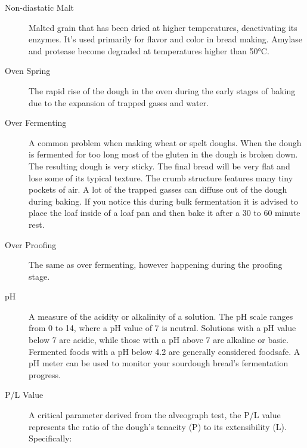 \begin{description}
\item[Non-diastatic Malt] Malted grain that has been dried at higher temperatures,
deactivating its enzymes. It's used primarily for flavor and color in bread making.
Amylase and protease become degraded at temperatures higher than 50°C.

\item[Oven Spring] The rapid rise of the dough in the oven during the early stages
of baking due to the expansion of trapped gases and water.

\item[Over Fermenting] A common problem when making wheat or spelt doughs. When the
dough is fermented for too long most of the gluten in the dough is broken down. The
resulting dough is very sticky. The final bread will be very flat and lose some of its
typical texture. The crumb structure features many tiny pockets of air. A lot of the
trapped gasses can diffuse out of the dough during baking. If you notice this during
bulk fermentation it is advised to place the loaf inside of a loaf pan and then bake
it after a 30 to 60 minute rest.

\item[Over Proofing] The same as over fermenting, however happening during the
proofing stage.

\item[pH] A measure of the acidity or alkalinity of a solution. The pH scale
ranges from 0 to 14, where a pH value of 7 is neutral. Solutions with a pH value below
7 are acidic, while those with a pH above 7 are alkaline or basic. Fermented
foods with a pH below 4.2 are generally considered foodsafe. A pH meter can be
used to monitor your sourdough bread's fermentation progress.

\item[P/L Value] A critical parameter derived from the alveograph test, the P/L
value represents the ratio of the dough's tenacity (P) to its extensibility (L).
Specifically:


\end{description}
